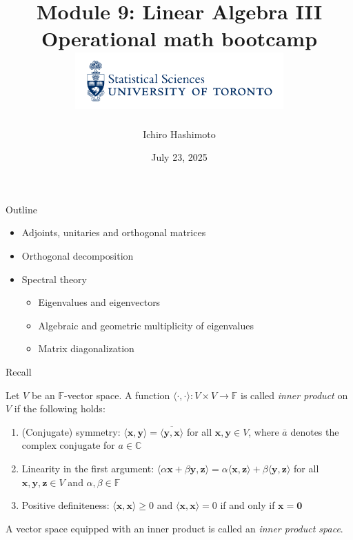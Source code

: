 \documentclass [aspectratio=169]{beamer}
\title[]{Module 9: Linear Algebra III \\ {\large Operational math bootcamp}\\ \includegraphics[width=8cm]{dept_logo.png}\vspace{-1em}}
\author[]{Ichiro Hashimoto}
\institute[]{University of Toronto}
\date{July 23, 2025}
\newcommand{\bx}{{\mathbf{x}}}
\newcommand{\by}{{\mathbf{y}}}
\newcommand{\bz}{{\mathbf{z}}}
\newcommand{\zerovec}{{\mathbf{0}}}
\newcommand{\innerprod}[1]{\langle #1 \rangle}
\newcommand{\C}{{\mathbb{C}}}
\newcommand{\F}{{\mathbb{F}}}
\begin{document}
{
\begin{frame}
    \titlepage
\end{frame}
}

\begin{frame}{Outline}

\begin{itemize}
\setlength\itemsep{1em}
\item Adjoints, unitaries and orthogonal matrices
\item Orthogonal decomposition
\item Spectral theory
    \begin{itemize}
      \setlength\itemsep{0.5em}
    	\item Eigenvalues and eigenvectors
	\item Algebraic and geometric multiplicity of eigenvalues
	\item Matrix diagonalization
    \end{itemize}
\end{itemize}

\end{frame}


\begin{frame}{Recall}
\begin{definition}
Let $V$ be an $\F$-vector space. A function $\innerprod{\cdot,\cdot} \colon V \times V \to \F$ is called \emph{inner product} on $V$ if the following holds:
\begin{enumerate}
\setlength\itemsep{0.5em}
    \item (Conjugate) symmetry: $\innerprod{\bx,\by} = \overline{\innerprod{\by,\bx}}$ for all $\bx,\by\in V$, where $\overline{a}$ denotes the complex conjugate for $a\in \C$
    \item Linearity in the first argument: $\innerprod{\alpha \bx + \beta \by, \bz} = \alpha \innerprod{\bx,\bz} + \beta \innerprod{\by,\bz}$ for all $\bx,\by,\bz\in V$ and $\alpha, \beta \in \F$
    \item Positive definiteness: $\innerprod{\bx,\bx} \geq 0$ and $\innerprod{\bx,\bx} = 0$ if and only if $\bx = \zerovec$ 
\end{enumerate}
\vspace{1em}
A vector space equipped with an inner product is called an \emph{inner product space}.
\end{definition}

\end{frame}
\end{document}
